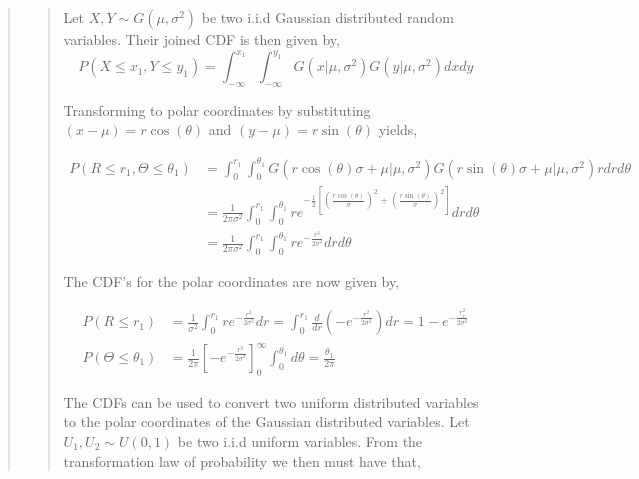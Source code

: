 \begin{quote}
\begin{quote}


Let $X, Y \sim G(\mu, \sigma ^2)$ be two i.i.d Gaussian distributed random variables. Their joined CDF is then given by, 
\begin{equation}
P(X \leq x_1, Y \leq y_1) =  \int_{-\infty}^{x_1} \int_{-\infty}^{y_1} G(x| \mu, \sigma^2) G(y| \mu, \sigma^2) dx dy
\end{equation}

Transforming to polar coordinates by substituting $ (x-\mu) = r \cos(\theta)$ and $ (y-\mu) = r\sin(\theta)$ yields,

\begin{align*}
P(R \leq r_1, \Theta \leq \theta_1) &= \int_0^{r_1} \int_{0}^{\theta_1} G(r\cos(\theta) \sigma + \mu| \mu, \sigma^2) G(r\sin(\theta) \sigma + \mu| \mu, \sigma^2) r dr d\theta \\
&= \frac{1}{2 \pi \sigma^2} \int_0^{r_1} \int_{0}^{\theta_1} re^{ -\frac{1}{2} \left[ \left( \frac{r\cos(\theta)}{\sigma} \right)^2  + \left( \frac{r\sin(\theta)}{\sigma} \right)^2 \right]}  dr d\theta \\
&=  \frac{1}{2 \pi \sigma^2} \int_0^{r_1} \int_{0}^{\theta_1} re^{ -\frac{r^2}{2 \sigma ^2} } dr d\theta
\end{align*}

The CDF's  for the polar coordinates are now given by, %

\begin{align}
P(R \leq r_1) &= \frac{1}{\sigma^2} \int_{0}^{r_1}  re^{ -\frac{r^2}{2 \sigma ^2} } dr =  \int_{0}^{r_1} \frac{d}{dr} \left( -e^{ -\frac{r^2}{2 \sigma ^2}}  \right) dr = 1 - e^{- \frac{r_1^2}{2 \sigma^2}} \\
P(\Theta \leq \theta_1) &= \frac{1}{2 \pi }  \left[ -e^{-\frac{r^2}{2 \sigma^2}} \right]^{\infty}_{0} \int_{0}^{\theta_1} d\theta = \frac{\theta_1}{2\pi}
\end{align}

The CDFs can be used to convert  two uniform distributed variables to the polar coordinates of the Gaussian distributed variables. Let $U_1, U_2 \sim U(0,1)$ be two i.i.d uniform variables. From the transformation law of probability we then must have that, %


\end{quote}
\end{quote}
